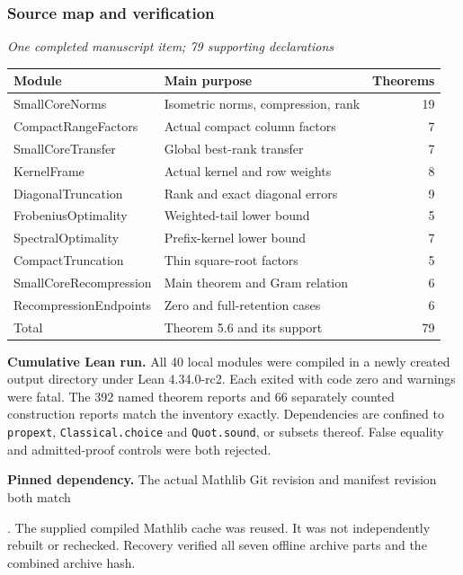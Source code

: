 \subsubsection*{Source map and verification}\label{history:supp6:subsection:006}\textit{One completed manuscript item; 79 supporting declarations}\par
\begin{center}\small
\renewcommand{\arraystretch}{1.18}
\begin{tabular}{@{}p{}p{}r@{}}
\toprule
Module & Main purpose & Theorems\\
\midrule
SmallCoreNorms & Isometric norms, compression, rank & 19\\
CompactRangeFactors & Actual compact column factors & 7\\
SmallCoreTransfer & Global best-rank transfer & 7\\
KernelFrame & Actual kernel and row weights & 8\\
DiagonalTruncation & Rank and exact diagonal errors & 9\\
FrobeniusOptimality & Weighted-tail lower bound & 5\\
SpectralOptimality & Prefix-kernel lower bound & 7\\
CompactTruncation & Thin square-root factors & 5\\
SmallCoreRecompression & Main theorem and Gram relation & 6\\
RecompressionEndpoints & Zero and full-retention cases & 6\\
\midrule
Total & Theorem 5.6 and its support & 79\\
\bottomrule
\end{tabular}
\end{center}

\textbf{Cumulative Lean run.} All 40 local modules were compiled in a newly created output directory under Lean 4.34.0-rc2. Each exited with code zero and warnings were fatal. The 392 named theorem reports and 66 separately counted construction reports match the inventory exactly. Dependencies are confined to \texttt{propext}, \texttt{Classical.choice} and \texttt{Quot.sound}, or subsets thereof. False equality and admitted-proof controls were both rejected.

\textbf{Pinned dependency.} The actual Mathlib Git revision and manifest revision both match\par
{}.
The supplied compiled Mathlib cache was reused. It was not independently rebuilt or rechecked. Recovery verified all seven offline archive parts and the combined archive hash.

